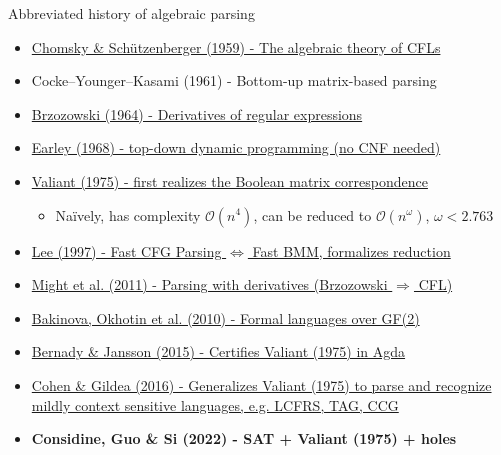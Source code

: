 \documentclass{beamer}
\begin{document}
    \begin{frame}{Abbreviated history of algebraic parsing}
        \begin{itemize}
            \item \href{http://www-igm.univ-mlv.fr/~berstel/Mps/Travaux/A/1963-7ChomskyAlgebraic.pdf}{Chomsky \& Sch\"utzenberger (1959) - The algebraic theory of CFLs}
            \item Cocke–Younger–Kasami (1961) - Bottom-up matrix-based parsing
            \item \href{https://dl.acm.org/doi/10.1145/321239.321249}{Brzozowski (1964) - Derivatives of regular expressions}
            \item \href{https://dl.acm.org/doi/10.1145/362007.362035}{Earley (1968) - top-down dynamic programming (no CNF needed)}
            \item \href{http://theory.stanford.edu/~virgi/cs367/papers/valiantcfg.pdf}{Valiant (1975) - first realizes the Boolean matrix correspondence}
            \begin{itemize}
                \item Na\"ively, has complexity $\mathcal{O}(n^4)$, can be reduced to $\mathcal{O}(n^\omega)$, $\omega < 2.763$
            \end{itemize}
            \item \href{https://www.cs.cornell.edu/home/llee/papers/bmmcfl-jacm.pdf}{Lee (1997) - Fast CFG Parsing $\Longleftrightarrow$ Fast BMM, formalizes reduction}
            \item \href{https://matt.might.net/papers/might2011derivatives.pdf}{Might et al. (2011) - Parsing with derivatives (Brzozowski $\Rightarrow$ CFL)}
            \item \href{https://users.math-cs.spbu.ru/~okhotin/papers/formal_languages_gf2.pdf}{Bakinova, Okhotin et al. (2010) - Formal languages over GF(2)}
            \item \href{https://arxiv.org/pdf/1601.07724.pdf}{Bernady \& Jansson (2015) - Certifies Valiant (1975) in Agda}
            \item \href{https://arxiv.org/pdf/1504.08342.pdf}{Cohen \& Gildea (2016) - Generalizes Valiant (1975) to parse and recognize mildly context sensitive languages, e.g. LCFRS, TAG, CCG}
            \item \textbf{Considine, Guo \& Si (2022) - SAT + Valiant (1975) + holes}
        \end{itemize}
    \end{frame}
\end{document}
